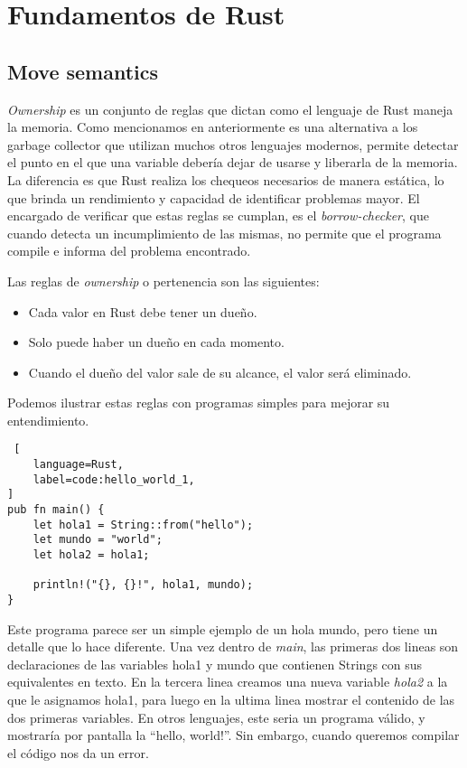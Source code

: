 \section{Fundamentos de Rust}
\subsection{Move semantics}

\textit{Ownership} es un conjunto de reglas que dictan como el lenguaje de Rust maneja la memoria. Como mencionamos en anteriormente es una alternativa a los garbage collector que utilizan muchos otros lenguajes modernos, permite detectar el punto en el que una variable debería dejar de usarse y liberarla de la memoria. La diferencia es que Rust realiza los chequeos necesarios de manera estática, lo que brinda un rendimiento y capacidad de identificar problemas mayor. El encargado de verificar que estas reglas se cumplan, es el \textit{borrow-checker}, que cuando detecta un incumplimiento de las mismas, no permite que el programa compile e informa del problema encontrado.

Las reglas de \textit{ownership} o pertenencia son las siguientes:
\begin{itemize}[noitemsep, nolistsep]
    \item Cada valor en Rust debe tener un dueño.
    \item Solo puede haber un dueño en cada momento.
    \item Cuando el dueño del valor sale de su alcance, el valor será eliminado.
\end{itemize}

Podemos ilustrar estas reglas con programas simples para mejorar su entendimiento.
\begin{lstlisting} [
    language=Rust,
    label=code:hello_world_1,
]
pub fn main() {
    let hola1 = String::from("hello");
    let mundo = "world";
    let hola2 = hola1;

    println!("{}, {}!", hola1, mundo);
}
\end{lstlisting}

Este programa parece ser un simple ejemplo de un hola mundo, pero tiene un detalle que lo hace diferente. Una vez dentro de \textit{main}, las primeras dos lineas son declaraciones de las variables hola1 y mundo que contienen Strings con sus equivalentes en texto. En la tercera linea creamos una nueva variable \textit{hola2} a la que le asignamos hola1, para luego en la ultima linea mostrar el contenido de las dos primeras variables. En otros lenguajes, este seria un programa válido, y mostraría por pantalla la ``hello, world!''. Sin embargo, cuando queremos compilar el código nos da un error.


